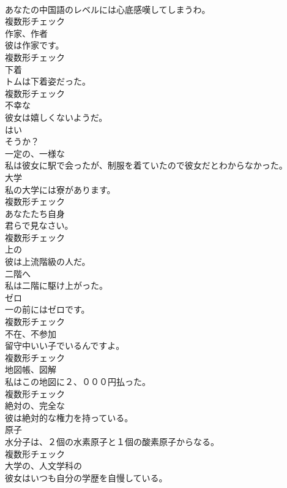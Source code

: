 \documentclass[8pt]{extreport}
\begin{document}
\begin{CJK}{UTF8}{min}
\\	あなたの中国語のレベルには心底感嘆してしまうわ。	
\\	複数形チェック
\\	[名詞]	作家、作者	
\\	彼は作家です。	
\\	複数形チェック
\\	[名詞]	下着	
\\	トムは下着姿だった。	
\\	複数形チェック
\\	[形容詞]	不幸な	
\\	彼女は嬉しくないようだ。	
\\	[副詞]	はい	
\\	そうか？	
\\	[形容詞]	一定の、一様な	
\\	私は彼女に駅で会ったが、制服を着ていたので彼女だとわからなかった。	
\\	[名詞]	大学	
\\	私の大学には寮があります。	
\\	複数形チェック
\\	[代名詞]	あなたたち自身	
\\	君らで見なさい。	
\\	複数形チェック
\\	[形容詞]	上の	
\\	彼は上流階級の人だ。	
\\	[副詞]	二階へ	
\\	私は二階に駆け上がった。	
\\	[名詞]	ゼロ	
\\	一の前にはゼロです。	
\\	複数形チェック
\\	[名詞]	不在、不参加	
\\	留守中いい子でいるんですよ。	
\\	複数形チェック
\\	[名詞]	地図帳、図解	
\\	私はこの地図に２、０００円払った。	
\\	複数形チェック
\\	[形容詞]	絶対の、完全な	
\\	彼は絶対的な権力を持っている。	
\\	[名詞]	原子	
\\	水分子は、２個の水素原子と１個の酸素原子からなる。	
\\	複数形チェック
\\	[形容詞]	大学の、人文学科の	
\\	彼女はいつも自分の学歴を自慢している。	

\end{CJK}
\end{document}
